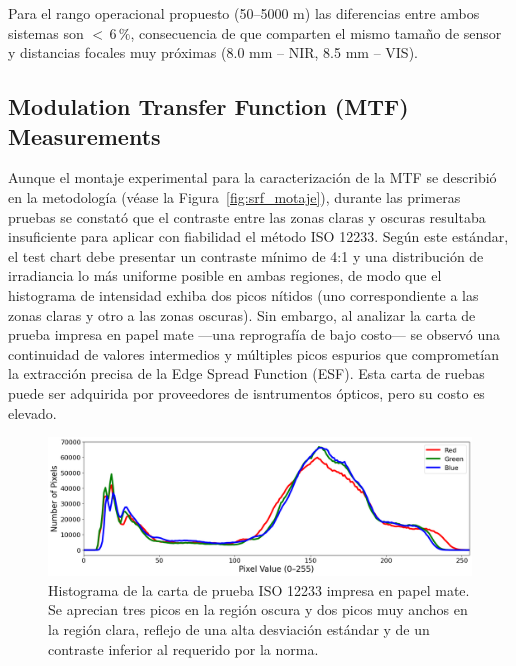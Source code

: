     Para el rango operacional propuesto (50–5000 m) las diferencias
    entre ambos sistemas son $<\,6\,\%$, consecuencia de que comparten el mismo
    tamaño de sensor y distancias focales muy próximas
    (8.0 mm – NIR, 8.5 mm – VIS).  

     \subsection{Modulation Transfer Function (MTF) Measurements}
      \label{sec:mtf_results}
      Aunque el montaje experimental para la caracterización de la MTF se describió en la metodología (véase la Figura~\ref{fig:srf_motaje}), durante las primeras pruebas se constató que el contraste entre las zonas claras y oscuras resultaba insuficiente para aplicar con fiabilidad el método ISO 12233. Según este estándar, el test chart debe presentar un contraste mínimo de 4:1 y una distribución de irradiancia lo más uniforme posible en ambas regiones, de modo que el histograma de intensidad exhiba dos picos nítidos (uno correspondiente a las zonas claras y otro a las zonas oscuras). Sin embargo, al analizar la carta de prueba impresa en papel mate —una reprografía de bajo costo— se observó una continuidad de valores intermedios y múltiples picos espurios que comprometían la extracción precisa de la Edge Spread Function (ESF). Esta carta de ruebas puede ser adquirida por proveedores de isntrumentos ópticos, pero su costo es elevado.\\

      \begin{figure}[h]
          \centering
          \includegraphics[width=0.7\linewidth]{Figures/C4/MTF_chart_hist.png}
          \caption{Histograma de la carta de prueba ISO 12233 impresa en papel mate. Se aprecian tres picos en la región oscura y dos picos muy anchos en la región clara, reflejo de una alta desviación estándar y de un contraste inferior al requerido por la norma.}
          \label{fig:histogram_iso12233}
      \end{figure}
      
